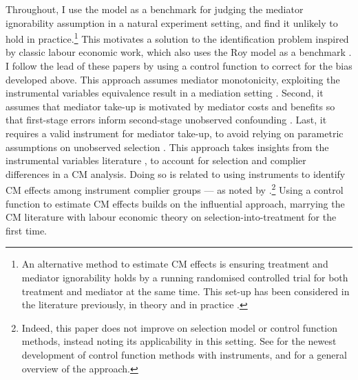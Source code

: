 Throughout, I use the \cite{roy1951some} model as a benchmark for judging the \cite{imai2010identification} mediator ignorability assumption in a natural experiment setting, and find it unlikely to hold in practice.\footnote{
    An alternative method to estimate CM effects is ensuring treatment and mediator ignorability holds by a running randomised controlled trial for both treatment and mediator at the same time.
    This set-up has been considered in the literature previously, in theory \citep{imai2013experimental,heckman2015econometric} and in practice \citep{ludwig2011mechanism,heckman2013understanding}.
}
This motivates a solution to the identification problem inspired by classic labour economic work, which also uses the Roy model as a benchmark \citep{heckman1979sample,heckman1990empirical}.
I follow the lead of these papers by using a control function to correct for the bias developed above.
This approach assumes mediator monotonicity, exploiting the instrumental variables equivalence result in a mediation setting \citep{vytlacil2002independence}.
Second, it assumes that mediator take-up is motivated by mediator costs and benefits so that first-stage errors inform second-stage unobserved confounding \citep{florens2008identification}.
Last, it requires a valid instrument for mediator take-up, to avoid relying on parametric assumptions on unobserved selection \citep{heckman2004using}.
This approach takes insights from the instrumental variables literature \citep{kline2019heckits}, to account for selection and complier differences in a CM analysis.
Doing so is related to using instruments to identify CM effects among instrument complier groups --- as noted by \cite{frolich2017direct}.\footnote{
    Indeed, this paper does not improve on selection model or control function methods, instead noting its applicability in this setting.
    See \cite{frolich2017direct} for the newest development of control function methods with instruments, and \cite{imbens2007nonadditive} for a general overview of the approach.
}
Using a control function to estimate CM effects builds on the influential \cite{imai2010identification} approach, marrying the CM literature with labour economic theory on selection-into-treatment for the first time. 

